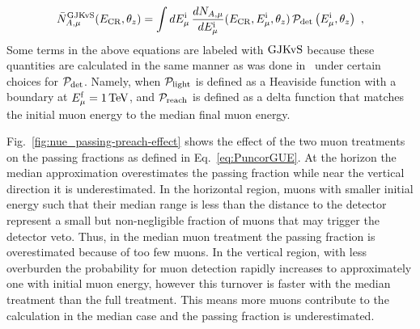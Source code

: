 \begin{equation}
\label{eq:Nmu}
\bar N_{A, \mu}^{\rm GJKvS}(E_{\rm CR},\theta_z) = \int dE_{\mu}^{\rm i} \, \frac{dN_{A, \mu}}{dE_{\mu}^{\rm i}}(E_{\rm CR}, E_{\mu}^{\rm i},  \theta_z) \, {\cal P}_{\rm det}\left(E_{\mu}^{\rm i} , \theta_z\right) ~,
\end{equation}
Some terms in the above equations are labeled with ${\rm GJKvS}$ because these quantities are calculated in the same manner as was done in~\cite{Gaisser:2014bja} under certain choices for ${\cal P}_{\rm det}$.
Namely, when ${\cal P}_{\rm light}$ is defined as a Heaviside function with a boundary at $\Emf = \SI{1}\TeV$, and ${\cal P}_{\rm reach}$ is defined as a delta function that matches the initial muon energy to the median final muon energy.

Fig.~\ref{fig:nue_passing-preach-effect} shows the effect of the two muon treatments on the passing fractions as defined in Eq.~\ref{eq:PuncorGUE}.
At the horizon the median approximation overestimates the passing fraction while near the vertical direction it is underestimated.
In the horizontal region, muons with smaller initial energy such that their median range is less than the distance to the detector represent a small but non-negligible fraction of muons that may trigger the detector veto.
Thus, in the median muon treatment the passing fraction is overestimated because of too few muons.
In the vertical region, with less overburden the probability for muon detection rapidly increases to approximately one with initial muon energy, however this turnover is faster with the median treatment than the full treatment.
This means more muons contribute to the calculation in the median case and the passing fraction is underestimated.

